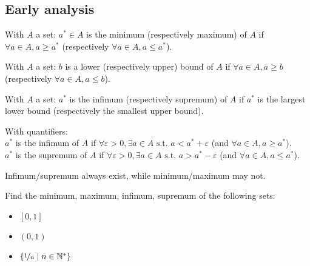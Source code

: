 \subsection{Early analysis}
\begin{definition}
    With $A$ a set: $a^* \in A$ is the minimum (respectively maximum) of $A$ if $\forall a \in A, a \geq a^*$ (respectively $\forall a \in A, a \leq a^*$).
\end{definition}
\begin{definition}
    With $A$ a set: $b$ is a lower (respectively upper) bound of $A$ if $\forall a \in A, a \geq b$ (respectively $\forall a \in A, a \leq b$).
\end{definition}
\begin{definition}
    With $A$ a set: $a^*$ is the infimum (respectively supremum) of $A$ if $a^*$ is the largest lower bound (respectively the smallest upper bound).
    
    With quantifiers:\\
    $a^*$ is the infimum of $A$ if $\forall \varepsilon>0, \exists a \in A \text{ s.t. } a < a^* + \varepsilon$ (and $\forall a \in A, a \geq a^*$).\\
    $a^*$ is the supremum of $A$ if $\forall \varepsilon>0, \exists a \in A \text{ s.t. } a > a^* - \varepsilon$ (and $\forall a \in A, a \leq a^*$).
\end{definition}
Infimum/supremum always exist, while minimum/maximum may not.
\begin{question} Find the minimum, maximum, infimum, supremum of the following sets:
    \begin{itemize}
        \item $\left[0,1\right]$
        \item $\left(0,1\right)$
        \item $\{ \nicefrac{1}{n} \mid n \in \mathbb{N}^* \}$
    \end{itemize}
\end{question}



